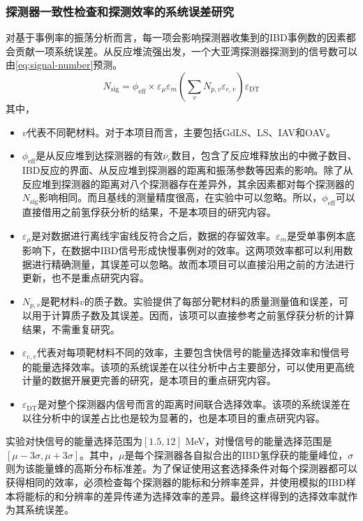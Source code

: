 \documentclass[a4paper,zihao=-4]{article}
\begin{document}
\subsubsection{探测器一致性检查和探测效率的系统误差研究}\label{sec:uncertainty}
对基于事例率的振荡分析而言，每一项会影响探测器收集到的IBD事例数的因素都会贡献一项系统误差。从反应堆流强出发，一个大亚湾探测器探测到的信号数可以由\cref{eq:signal-number}预测。
\begin{equation}\label{eq:signal-number}
	N_{\text{sig}} = \phi_{\text{eff}} \times \varepsilon_\mu\varepsilon_m\left(\sum_{v}N_{p,v}\varepsilon_{e,v}\right)\varepsilon_{\text{DT}}
\end{equation}
其中，
\begin{itemize}
	\item $v$代表不同靶材料。对于本项目而言，主要包括GdLS、LS、IAV和OAV。
	\item $\phi_{\text{eff}}$是从反应堆到达探测器的有效$\overline{\nu}_e$数目，包含了反应堆释放出的中微子数目、IBD反应的界面、从反应堆到探测器的距离和振荡参数等因素的影响。除了从反应堆到探测器的距离对八个探测器存在差异外，其余因素都对每个探测器的$N_{\text{sig}}$影响相同。而且基线的测量精度很高，在实验中可以忽略。所以，$\phi_{\text{eff}}$可以直接借用之前氢俘获分析的结果，不是本项目的研究内容。
	\item $\varepsilon_\mu$是对数据进行离线宇宙线反符合之后，数据的存留效率。$\varepsilon_m$是受单事例本底影响下，在数据中IBD信号形成快慢事例对的效率。这两项效率都可以利用数据进行精确测量，其误差可以忽略。故而本项目可以直接沿用之前的方法进行更新，也不是重点研究内容。
	\item $N_{p,v}$是靶材料$v$的质子数。实验提供了每部分靶材料的质量测量值和误差，可以用于计算质子数及其误差。因而，该项可以直接参考之前氢俘获分析的计算结果，不需重复研究。
	\item $\varepsilon_{e,v}$代表对每项靶材料不同的效率，主要包含快信号的能量选择效率和慢信号的能量选择效率。该项的系统误差在以往分析中占主要部分，可以使用更高统计量的数据开展更完善的研究，是本项目的重点研究内容。
	\item $\varepsilon_{\text{DT}}$是对整个探测器内信号而言的距离时间联合选择效率。该项的系统误差在以往分析中的误差占比也是较为显著的，也是本项目的重点研究内容。
\end{itemize}

实验对快信号的能量选择范围为$[1.5, 12]$ MeV，对慢信号的能量选择范围是$[\mu-3\sigma, \mu+3\sigma]$。其中，$\mu$是每个探测器各自拟合出的IBD氢俘获的能量峰位，$\sigma$则为该能量蜂的高斯分布标准差。为了保证使用这套选择条件对每个探测器都可以获得相同的效率，必须检查每个探测器的能标和分辨率差异，并使用模拟的IBD样本将能标的和分辨率的差异传递为选择效率的差异。最终这样得到的选择效率就作为其系统误差。
\end{document}
